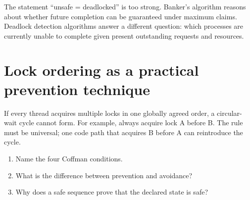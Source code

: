 \begin{pitfall}
The statement ``unsafe = deadlocked'' is too strong. Banker's algorithm reasons about whether future completion can be guaranteed under maximum claims. Deadlock detection algorithms answer a different question: which processes are currently unable to complete given present outstanding requests and resources.
\end{pitfall}

\section{Lock ordering as a practical prevention technique}
If every thread acquires multiple locks in one globally agreed order, a circular-wait cycle cannot form. For example, always acquire lock A before B. The rule must be universal; one code path that acquires B before A can reintroduce the cycle.

\begin{quickcheck}
\begin{enumerate}
  \item Name the four Coffman conditions.
  \item What is the difference between prevention and avoidance?
  \item Why does a safe sequence prove that the declared state is safe?
\end{enumerate}
\end{quickcheck}
